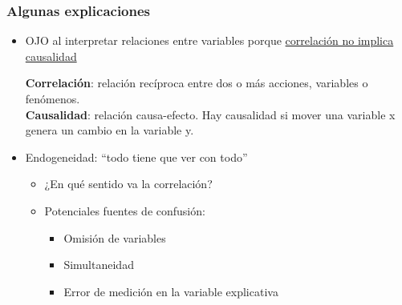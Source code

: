 \documentclass{beamer}
\begin{document}
\begin{frame} \label{uno}
    \frametitle{Algunas explicaciones}
    \begin{itemize}
        \item OJO al interpretar relaciones entre variables porque \hyperlink{hdos}{correlación no implica causalidad} 
        \begin{boxB}
        \textbf{Correlación}: relación recíproca entre dos o más acciones, variables o fenómenos. \\
        \textbf{Causalidad}: relación causa-efecto. Hay causalidad si mover una variable x genera un cambio en la variable y.
        \end{boxB}
        \item Endogeneidad: ``todo tiene que ver con todo'' \vspace{1mm}
        \begin{itemize} 
         \item ¿En qué sentido va la correlación?
            \item Potenciales fuentes de confusión:
            \begin{itemize}
                \item {Omisión de variables}  
                \item {Simultaneidad} 
                \item {Error de medición en la variable explicativa}
            \end{itemize}
        \end{itemize}
    \end{itemize}
\end{frame}

\end{document}
